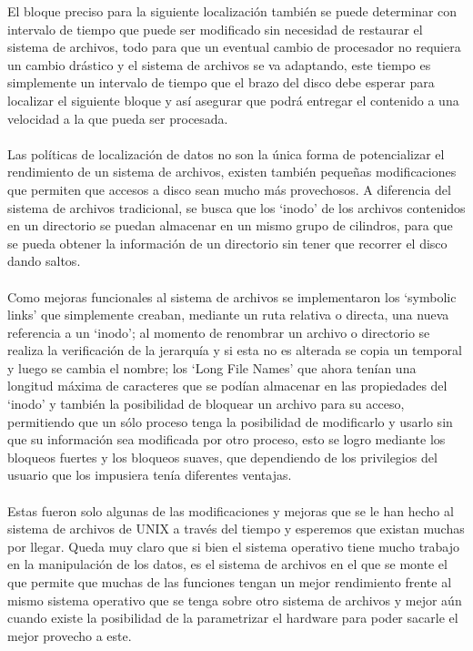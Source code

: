 \documentclass[]{article}
\begin{document}
El bloque preciso para la siguiente localización también se puede determinar con intervalo de tiempo que puede ser modificado sin necesidad de restaurar el sistema
de archivos, todo para
que un eventual cambio de procesador no requiera un cambio drástico y el sistema de archivos se
va adaptando, este tiempo es simplemente un intervalo de tiempo que el brazo del disco debe esperar para localizar el siguiente bloque y así asegurar que podrá entregar
el contenido a una velocidad a la que pueda ser procesada.
\\\\
Las políticas de localización de datos no son la única forma de potencializar el rendimiento de  
un sistema de archivos, existen también pequeñas modificaciones que permiten que accesos a
disco sean mucho más provechosos. A diferencia del sistema de archivos tradicional, se busca
que los `inodo’ de los archivos contenidos en un directorio se puedan almacenar en un mismo
grupo de cilindros, para que se pueda obtener la información de un directorio sin tener que recorrer el disco dando saltos.
\\\\
Como mejoras funcionales al sistema de archivos se implementaron los `symbolic links’ que simplemente creaban, mediante un ruta relativa o directa, una nueva referencia
a un `inodo’;
al momento de renombrar un archivo o directorio se realiza la verificación de la jerarquía y si
esta no es alterada se copia un temporal y luego se cambia el nombre; los `Long File Names’ que ahora tenían una longitud máxima de caracteres que se podían almacenar
en las propiedades del `inodo’ y también la posibilidad de bloquear un archivo para su acceso, permitiendo que un sólo proceso tenga la posibilidad de modificarlo y usarlo
sin que su información sea modificada por otro proceso, esto se logro mediante los bloqueos fuertes y los bloqueos suaves, que dependiendo de los privilegios del usuario
que los impusiera tenía diferentes ventajas.
\\\\
Estas fueron solo algunas de las modificaciones y mejoras que se le han hecho al sistema de archivos de UNIX a través del tiempo y esperemos que existan muchas por llegar.
Queda muy claro que si bien el sistema operativo tiene mucho trabajo en la manipulación de los
datos, es el sistema de archivos en el que se monte el que permite que muchas de las funciones
tengan un mejor rendimiento frente al mismo sistema operativo que se tenga sobre otro sistema de archivos y mejor aún cuando existe la posibilidad de la parametrizar el
hardware para poder sacarle el mejor provecho a este.
\end{document}

